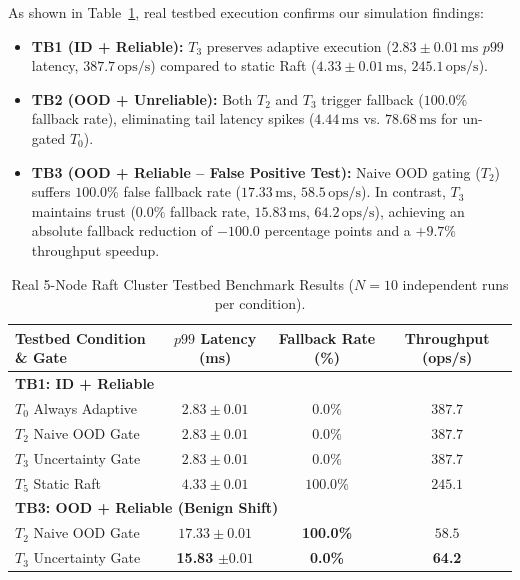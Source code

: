 As shown in Table~\ref{tab:testbed_results}, real testbed execution confirms our simulation findings:
\begin{itemize}
    \item \textbf{TB1 (ID + Reliable):} $T_3$ preserves adaptive execution ($2.83 \pm 0.01\,\text{ms}$ $p99$ latency, $387.7\,\text{ops/s}$) compared to static Raft ($4.33 \pm 0.01\,\text{ms}$, $245.1\,\text{ops/s}$).
    \item \textbf{TB2 (OOD + Unreliable):} Both $T_2$ and $T_3$ trigger fallback ($100.0\%$ fallback rate), eliminating tail latency spikes ($4.44\,\text{ms}$ vs. $78.68\,\text{ms}$ for un-gated $T_0$).
    \item \textbf{TB3 (OOD + Reliable -- False Positive Test):} Naive OOD gating ($T_2$) suffers $100.0\%$ false fallback rate ($17.33\,\text{ms}$, $58.5\,\text{ops/s}$). In contrast, $T_3$ maintains trust ($0.0\%$ fallback rate, $15.83\,\text{ms}$, $64.2\,\text{ops/s}$), achieving an absolute fallback reduction of $-100.0$ percentage points and a $+9.7\%$ throughput speedup.
\end{itemize}

\begin{table}[h]
\centering
\small
\begin{tabular}{|l|c|c|c|}
\hline
\textbf{Testbed Condition \& Gate} & \textbf{$p99$ Latency (ms)} & \textbf{Fallback Rate (\%)} & \textbf{Throughput (ops/s)} \\ \hline
\multicolumn{4}{|l|}{\textbf{TB1: ID + Reliable}} \\ \hline
$T_0$ Always Adaptive & $2.83 \pm 0.01$ & $0.0\%$ & $387.7$ \\ \hline
$T_2$ Naive OOD Gate & $2.83 \pm 0.01$ & $0.0\%$ & $387.7$ \\ \hline
$T_3$ Uncertainty Gate & $2.83 \pm 0.01$ & $0.0\%$ & $387.7$ \\ \hline
$T_5$ Static Raft & $4.33 \pm 0.01$ & $100.0\%$ & $245.1$ \\ \hline
\multicolumn{4}{|l|}{\textbf{TB3: OOD + Reliable (Benign Shift)}} \\ \hline
$T_2$ Naive OOD Gate & $17.33 \pm 0.01$ & \textbf{100.0\%} & $58.5$ \\ \hline
$T_3$ Uncertainty Gate & \textbf{15.83} $\pm \mathbf{0.01}$ & \textbf{0.0\%} & \textbf{64.2} \\ \hline
\end{tabular}
\caption{Real 5-Node Raft Cluster Testbed Benchmark Results ($N=10$ independent runs per condition).}
\label{tab:testbed_results}
\end{table}
